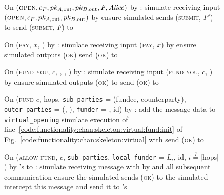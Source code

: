 \begin{figure}[H]
  \begin{simulatorbox}{\simulator}
    \begin{algorithmic}[1]
      \State On $(\textsc{open}, c_F, pk_{A, \mathrm{out}}, pk_{B,
      \mathrm{out}}, F, \mathit{Alice})$ by \fchan:
      \Indent
        \State simulate \alice receiving input $(\textsc{open}, c_F, pk_{A,
        \mathrm{out}}, pk_{B, \mathrm{out}})$ by \environment
        \State ensure simulated \alice sends (\textsc{submit}, $F'$) to \ledger
        \State send (\textsc{submit}, $F$) to \ledger
      \EndIndent
      \Statex

      \State On (\textsc{pay}, $x$, \dave) by \fchan:
      \Indent
        \State simulate \dave receiving input (\textsc{pay}, $x$) by \environment
        \State ensure simulated \dave outputs (\textsc{ok})
        \State send (\textsc{ok}) to \fchan
      \EndIndent
      \Statex

      \State On (\textsc{fund you}, $c$, \bob, \charlie, \alice) by \fchan:
      \Indent
        \State simulate \alice receiving input (\textsc{fund you}, $c$, \bob) by
        \charlie
        \State ensure simulated \alice outputs (\textsc{ok}) to \charlie
        \State send (\textsc{ok}) to \fchan
      \EndIndent
      \Statex

      \State On (\textsc{fund} $c$, hops, \texttt{sub\_parties} = (fundee,
      counterparty), \texttt{outer\_parties} = (\charlie, \dave),
      \texttt{funder} = \alice, id) by \fchan:
      \label{code:simulator:fund}
      \Indent
        \State add the message data to \texttt{virtual\_opening}
        \State simulate execution of
        line~\ref{code:functionality:chan:skeleton:virtual:fund:init} of
        Fig.~\ref{code:functionality:chan:skeleton:virtual} with \alice
        \State send (\textsc{ok}) to \fchan
        \label{code:simulator:fund:ok}
      \EndIndent
      \Statex

      \State On (\textsc{allow fund}, $c$, \texttt{sub\_parties},
      \texttt{local\_funder} = $L_i$, id, $i \overset{?}{=} |\mathrm{hops}|$) by
      \fchan's \alice to \charlie:
      \Indent
        \State simulate receiving message with \charlie by \alice and all
        subsequent communication
        \State ensure the simulated \charlie sends (\textsc{ok}) to the
        simulated \alice
        \State intercept this message and send it to \fchan's \alice
      \EndIndent
      \Statex


\end{algorithmic}
\end{simulatorbox}
\end{figure}

